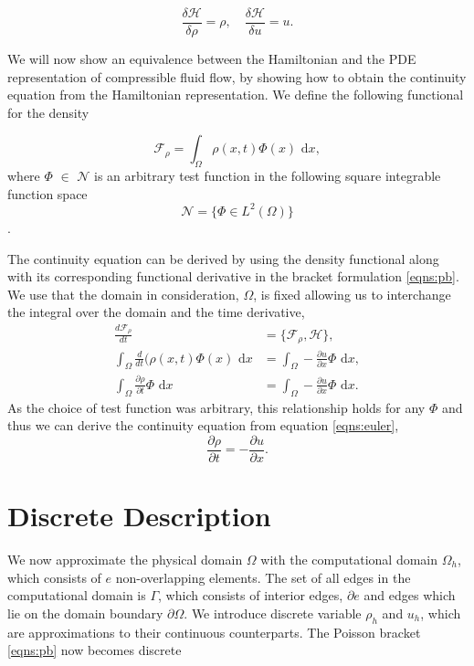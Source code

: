 \documentclass[a4paper,11pt]{article}
\begin{document}
\begin{equation}
\frac{\delta \mathcal{H}}{\delta \rho} =\rho, \quad
\frac{\delta \mathcal{H}}{\delta u}= u.
\end{equation}

We will now show an equivalence between the Hamiltonian and the PDE representation of compressible fluid flow, by showing how to obtain the continuity equation from the Hamiltonian representation. We define the following functional for the density

\[\mathcal{F}_\rho = \int_\Omega \rho (x,t) \Phi (x) \text{ d}x,\]
 where $\Phi$ $\in$ $\mathcal{N}$ is an arbitrary test function in the following square integrable function space
\[\mathcal{N} = \{ \Phi \in L^2(\Omega) \} \].

The continuity equation can be derived  by using the density functional along with its corresponding functional derivative in the bracket formulation \eqref{eqns:pb}.  We use that the domain in consideration, $\Omega$,  is fixed allowing us to interchange the  integral over the domain and the time derivative, 
\begin{equation}\label{functionalsderivs}
\begin{aligned}
\frac{d \mathcal{F}_\rho}{dt} &= \{\mathcal{F}_\rho, \mathcal{H} \},\\
\int_\Omega \frac{d}{dt}(\rho (x,t)  \Phi (x  ) \text{ d}x&=\int_\Omega - \frac{\partial u}{\partial x}\Phi \text{ d}x,\\
\int_\Omega \frac{\partial \rho}{\partial t}\Phi  \text{ d}x&= \int_\Omega - \frac{\partial u}{\partial x} \Phi \text{ d}x.
\end{aligned}
\end{equation}
As the choice of test function was arbitrary, this relationship holds for any $\Phi$ and thus we can derive the continuity equation  from equation \eqref{eqns:euler},
\begin{equation}
 \frac{\partial \rho}{\partial t} = - \frac{\partial u}{\partial x} .
\end{equation}


\section{ Discrete Description}

 We now approximate the physical domain $\Omega$ with the computational domain $\Omega_h$, which consists of $e$ non-overlapping elements. The set of all edges in the computational domain is $\Gamma$, which consists of interior edges, $\partial e $ and edges which lie on the domain boundary $\partial \Omega$. We introduce discrete variable $\rho_h$ and $u_h$, which are approximations to their continuous counterparts. The Poisson bracket \eqref{eqns:pb} now becomes discrete
\end{document}
